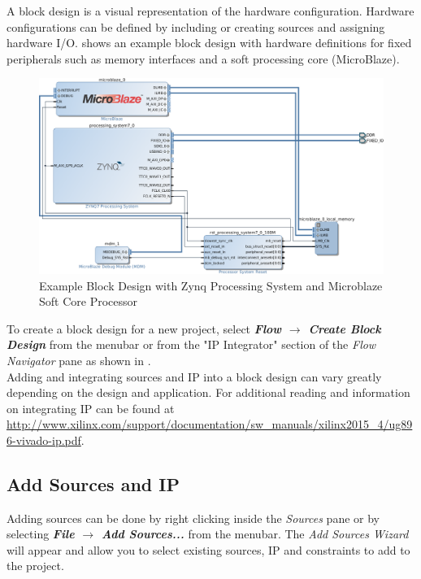 A block design is a visual representation of the hardware configuration. Hardware configurations can be defined by including or creating sources and assigning hardware I/O.  shows an example block design with hardware definitions for fixed peripherals such as memory interfaces and a soft processing core (MicroBlaze). \\

\begin{figure}
	\centering
	\includegraphics{images/Example_Block_Design.png}
	\caption{Example Block Design with Zynq Processing System and Microblaze Soft Core Processor}
	\label{fig:exampleblockdesign}
\end{figure}

\noindent
To create a block design for a new project, select \textit{\bfseries Flow $\rightarrow$ Create Block Design} from the menubar or from the "IP Integrator" section of the \textit{Flow Navigator} pane as shown in . \\

\noindent
Adding and integrating sources and IP into a block design can vary greatly depending on the design and application. For additional reading and information on integrating IP can be found at \url{http://www.xilinx.com/support/documentation/sw_manuals/xilinx2015_4/ug896-vivado-ip.pdf}. 

\newpage

\subsection{Add Sources and IP}
\label{sub:addsources}

Adding sources can be done by right clicking inside the \textit{Sources} pane or by selecting \textit{\bfseries File $\rightarrow$ Add Sources...} from the menubar. The \textit{Add Sources Wizard} will appear and allow you to select existing sources, IP and constraints to add to the project. \\


